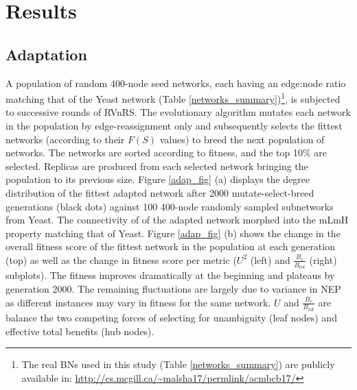 \section{Results}
\subsection{Adaptation}\label{adapt_section}
	A population of random 400-node seed networks, each having an edge:node ratio matching that of the Yeast network (Table \ref{networks_summary})\footnote{The real BNs used in this study (Table \ref{networks_summary}) are publicly available in: \url{http://cs.mcgill.ca/~malsha17/permlink/acmbcb17/}}, 
	is subjected to successive rounds  of RVnRS. 
	The evolutionary algorithm mutates each network in the population by edge-reassignment only and subsequently 
	selects the fittest networks (according to their $F(S)$ values) to breed the next population of networks.
	The networks are sorted according to fitness, and the top 10\% are selected. 
	Replicas are produced from each selected network bringing the population to its previous size. Figure \ref{adap_fig} (a) displays 
	the degree distribution of the fittest adapted network after 2000  mutate-select-breed generations (black dots) against 
	100 400-node randomly sampled subnetworks from Yeast. 
	The connectivity of of the adapted network morphed into the mLmH property matching that of Yeast. 
	Figure \ref{adap_fig} (b) shows the change in the overall 
	fitness score of the fittest network in the population at each generation (top) as well as the change in fitness score per metric 
	($U^2$ (left) and $\frac {B_e}{B_{tot}}$ (right) subplots). The fitness improves dramatically at the beginning and plateaus by generation 2000. 
	The remaining fluctuations are largely due to variance in NEP as different instances may vary in fitness for the same network. 
	$U$ and $\frac {B_e}{B_{tot}}$ are balance the two competing forces of selecting for unambiguity (leaf nodes) and effective total benefits (hub nodes). 

